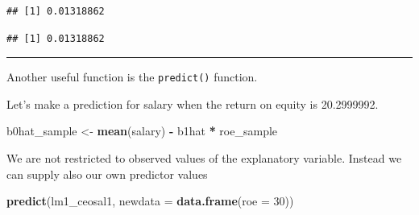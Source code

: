 \documentclass[]{book}
\newenvironment{Shaded}{\begin{snugshade}}{\end{snugshade}}
\newcommand{\DataTypeTok}[1]{\textcolor[rgb]{0.13,0.29,0.53}{#1}}
\newcommand{\DecValTok}[1]{\textcolor[rgb]{0.00,0.00,0.81}{#1}}
\newcommand{\KeywordTok}[1]{\textcolor[rgb]{0.13,0.29,0.53}{\textbf{#1}}}
\newcommand{\NormalTok}[1]{#1}
\newcommand{\OperatorTok}[1]{\textcolor[rgb]{0.81,0.36,0.00}{\textbf{#1}}}
\newcommand{\StringTok}[1]{\textcolor[rgb]{0.31,0.60,0.02}{#1}}
\begin{document}
\begin{verbatim}
## [1] 0.01318862
\end{verbatim}

\begin{Shaded}
\end{Shaded}

\begin{verbatim}
## [1] 0.01318862
\end{verbatim}

\begin{center}\rule{0.5\linewidth}{\linethickness}\end{center}

Another useful function is the \texttt{predict()} function.

\begin{Shaded}
\end{Shaded}

Let's make a prediction for salary when the return on equity is
20.2999992.

\begin{Shaded}
\begin{Highlighting}[]
\NormalTok{b0hat_sample <-}\StringTok{ }\KeywordTok{mean}\NormalTok{(salary) }\OperatorTok{-}\StringTok{ }\NormalTok{b1hat }\OperatorTok{*}\StringTok{ }\NormalTok{roe_sample }
\end{Highlighting}
\end{Shaded}

We are not restricted to observed values of the explanatory variable.
Instead we can supply also our own predictor values

\begin{Shaded}
\begin{Highlighting}[]
\KeywordTok{predict}\NormalTok{(lm1_ceosal1, }\DataTypeTok{newdata =} \KeywordTok{data.frame}\NormalTok{(}\DataTypeTok{roe =} \DecValTok{30}\NormalTok{))}
\end{Highlighting}
\end{Shaded}
\end{document}

